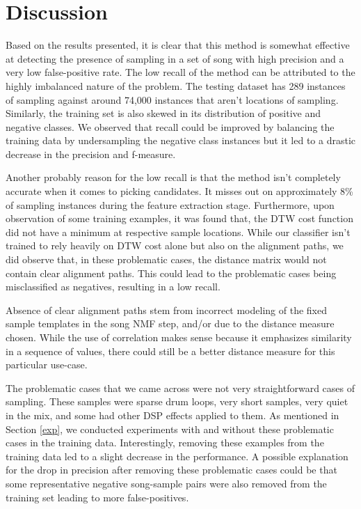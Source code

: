 \documentclass{article}
\begin{document}
\section{Discussion}
\label{disc}

Based on the results presented, it is clear that this method is somewhat effective at detecting the presence of sampling in a set of song with high precision and a very low false-positive rate. The low recall of the method can be attributed to the highly imbalanced nature of the problem. The testing dataset has 289 instances of sampling against around 74,000 instances that aren't locations of sampling. Similarly, the training set is also skewed in its distribution of positive and negative classes. We observed that recall could be improved by balancing the training data by undersampling the negative class instances but it led to a drastic decrease in the precision and f-measure. 

Another probably reason for the low recall is that the method isn't completely accurate when it comes to picking candidates. It misses out on approximately 8\% of sampling instances during the feature extraction stage. Furthermore, upon observation of some training examples, it was found that, the DTW cost function did not have a minimum at respective sample locations. While our classifier isn't trained to rely heavily on DTW cost alone but also on the alignment paths, we did observe that, in these problematic cases, the distance matrix would not contain clear alignment paths. This could lead to the problematic cases being misclassified as negatives, resulting in a low recall.

Absence of clear alignment paths stem from incorrect modeling of the fixed sample templates in the song NMF step, and/or due to the distance measure chosen. While the use of correlation makes sense because it emphasizes similarity in a sequence of values, there could still be a better distance measure for this particular use-case.

The problematic cases that we came across were not very straightforward cases of sampling. These samples were sparse drum loops, very short samples, very quiet in the mix, and some had other DSP effects applied to them. As mentioned in Section \ref{exp}, we conducted experiments with and without these problematic cases in the training data. Interestingly, removing these examples from the training data led to a slight decrease in the performance. A possible explanation for the drop in precision after removing these problematic cases could be that some representative negative song-sample pairs were also removed from the training set leading to more false-positives.
\end{document}
